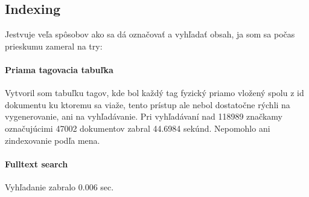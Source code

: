 \subsection{Indexing}

Jestvuje veľa spôsobov ako sa dá označovať a vyhľadať obsah, ja som sa počas prieskumu zameral na try:

\paragraph{Priama tagovacia tabuľka}

Vytvoril som tabuľku tagov, kde bol každý tag fyzický priamo vložený spolu z id dokumentu ku ktoremu sa viaže,
tento prístup ale nebol dostatočne rýchli na vygenerovanie, ani na vyhľadávanie. Pri vyhľadávaní nad 118989 značkamy 
označujúcimi 47002 dokumentov zabral 44.6984 sekúnd. Nepomohlo ani zindexovanie podľa mena.

\paragraph{Fulltext search}

Vyhľadanie zabralo 0.006 sec.

